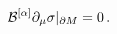 \begin{equation}
{\cal B}^{[\alpha]} \partial_\mu \sigma |_{\partial M}=0 \,.
\label{gauinv}
\end{equation}

